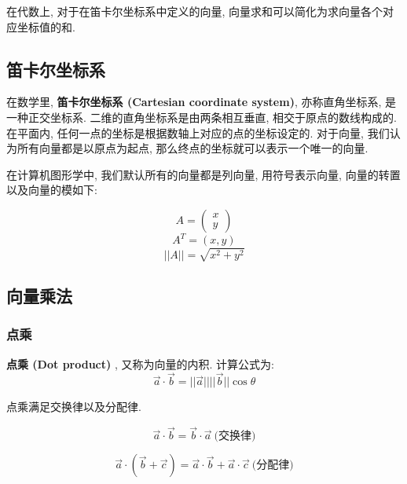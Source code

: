 \documentclass[openany]{progbookcn}
\begin{document}
在代数上, 对于在笛卡尔坐标系中定义的向量, 向量求和可以简化为求向量各个对应坐标值的和. 

\subsection{笛卡尔坐标系}
在数学里, \textbf{笛卡尔坐标系 (Cartesian coordinate system)}, 亦称直角坐标系, 是一种正交坐标系. 二维的直角坐标系是由两条相互垂直, 相交于原点的数线构成的. 在平面内, 任何一点的坐标是根据数轴上对应的点的坐标设定的. 对于向量, 我们认为所有向量都是以原点为起点, 那么终点的坐标就可以表示一个唯一的向量. 

在计算机图形学中, 我们默认所有的向量都是列向量, 用符号表示向量, 向量的转置以及向量的模如下: 

\begin{equation}
A=\begin{pmatrix}
x\\ 
y
\end{pmatrix}
\end{equation}
\begin{equation}
A^T=(x,y)
\end{equation}
\begin{equation}
||A||=\sqrt{x^2+y^2}
\end{equation}

\subsection{向量乘法}

\subsubsection{点乘}

\textbf{点乘 (Dot product) }, 又称为向量的内积. 计算公式为: 
\begin{equation}
	\overrightarrow{a} \cdot \overrightarrow{b} = ||\overrightarrow{a}||||\overrightarrow{b}||\cos\theta
\end{equation}

点乘满足交换律以及分配律. 

\begin{equation}
	\overrightarrow{a} \cdot \overrightarrow{b} = \overrightarrow{b} \cdot \overrightarrow{a}\ \text{(交换律)}
\end{equation}


\begin{equation}
	\overrightarrow{a} \cdot (\overrightarrow{b}+\overrightarrow{c}) = \overrightarrow{a} \cdot \overrightarrow{b}+\overrightarrow{a} \cdot \overrightarrow{c}\ \text{(分配律)}
\end{equation}
\end{document}
